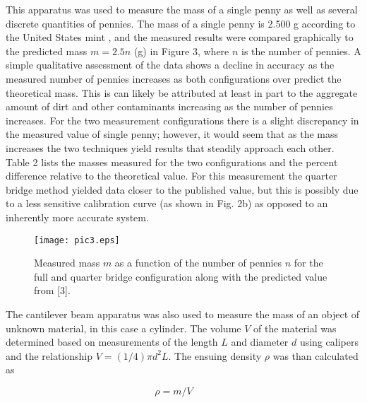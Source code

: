 \documentclass[12pt, letterpaper]{article}
\begin{document}
\mbox{} 
This apparatus was used to measure the mass of a single penny as well as
several discrete quantities of pennies. The mass of a single penny is 2.500 g
according to the United States mint \cite{us}, and the measured results were
compared graphically to the predicted mass $m = 2.5n$ (g) in Figure 3, where
$n$ is the number of pennies. A simple qualitative assessment of the data
shows a decline in accuracy as the measured number of pennies increases as
both configurations over predict the theoretical mass. This is can likely be
attributed at least in part to the aggregate amount of dirt and other
contaminants increasing as the number of pennies increases. For the two
measurement configurations there is a slight discrepancy in the measured value
of single penny; however, it would seem that as the mass increases the two
techniques yield results that steadily approach each other. Table 2 lists the
masses measured for the two configurations and the percent difference relative
to the theoretical value. For this measurement the quarter bridge method
yielded data closer to the published value, but this is possibly due to a less
sensitive calibration curve (as shown in Fig. 2b) as opposed to an inherently
more accurate system.


\begin{figure}[h!]
\begin{center}
\texttt{[image: pic3.eps]}
\caption{Measured mass $m$ as a function of the number of pennies $n$
   for the full and quarter bridge configuration along with the
predicted value from [3].}
\label{pic3.fig}
\end{center}
\end{figure}

The cantilever beam apparatus was also used to measure the mass of an object
of unknown material, in this case a cylinder. The volume $V$ of the material
was determined based on measurements of the length $L$ and diameter $d$ using
calipers and the relationship $V = (1/4)\pi d^2 L $. The ensuing
density $\rho$ was than calculated as

\begin{equation}
   \rho = m/V \qquad 
\end{equation}
\end{document}
